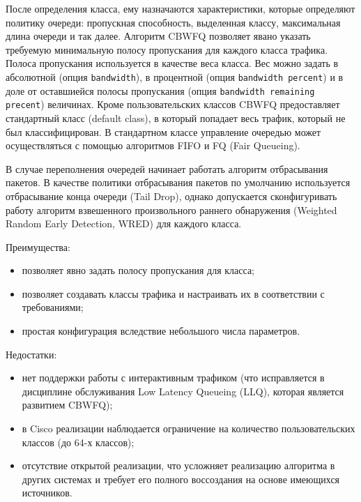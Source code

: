     После определения класса, ему назначаются характеристики, которые определяют
    политику очереди: пропускная способность, выделенная классу, максимальная
    длина очереди и так далее. Алгоритм CBWFQ позволяет явано указать требуемую минимальную
    полосу пропускания для каждого класса трафика. Полоса пропускания используется
    в качестве веса класса. Вес можно задать в абсолютной (опция \texttt{bandwidth}),
    в процентной (опция \texttt{bandwidth percent}) и в доле от оставшиейся
    полосы пропускания (опция \texttt{bandwidth remaining precent}) величинах.
    Кроме пользовательских классов CBWFQ предоставляет стандартный класс (default class),
    в который попадает весь трафик, который не был классифицирован. В стандартном классе
    управление очередью может осуществляться с помощью алгоритмов FIFO и FQ (Fair Queueing). \cite{ciscoguide} 

    В случае переполнения очередей начинает работать алгоритм отбрасывания пакетов.
    В качестве политики отбрасывания пакетов по умолчанию используется отбрасывание конца
    очереди (Tail Drop), однако допускается сконфигуривать работу
    алгоритм взвешенного произвольного раннего обнаружения (Weighted Random Early Detection, WRED)
    для каждого класса.\cite{ciscoguide}

	Преимущества:
	\begin{itemize}
		\item позволяет явно задать полосу пропускания для класса;
		\item позволяет создавать классы трафика и настраивать их в соответствии с требованиями;
		\item простая конфигурация вследствие небольшого числа параметров.\cite{Vagesna}\cite{ciscoguide}
	\end{itemize}

	Недостатки:
	\begin{itemize}
		\item нет поддержки работы с интерактивным трафиком (что исправляется в дисциплине обслуживания Low Latency Queueing (LLQ),
		которая является развитием CBWFQ);
		\item в Cisco реализации наблюдается ограничение на количество пользовательских классов (до 64-х классов);\cite{Vagesna}
		\item отсутствие открытой реализации, что усложняет реализацию алгоритма в других системах и требует его полного воссоздания
		на основе имеющихся источников.
	\end{itemize}

